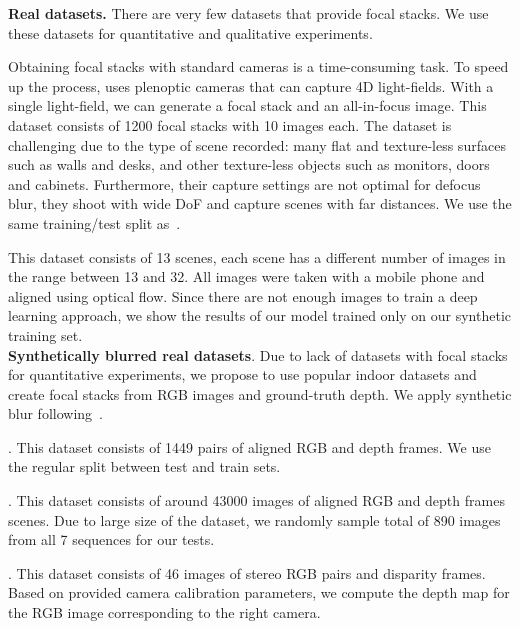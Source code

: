 \documentclass[10pt,twocolumn,letterpaper]{article}
\begin{document}
\noindent\textbf{Real datasets.} There are very few datasets that provide focal stacks. We use these datasets for quantitative and qualitative experiments.

 Obtaining focal stacks with standard cameras is a time-consuming task. To speed up the process, \cite{Hazirbas18} uses plenoptic cameras that can capture 4D light-fields. With a single light-field, we can generate a focal stack and an all-in-focus image. 
This dataset consists of 1200 focal stacks with 10 images each. 
The dataset is challenging due to the type of scene recorded: many flat and texture-less surfaces such as walls and desks, and other texture-less objects such as monitors, doors and cabinets. Furthermore, their capture settings are not optimal for defocus blur, they shoot with wide DoF and capture scenes with far distances.
We use the same training/test split as~\cite{Hazirbas18}. 

 This dataset consists of 13 scenes, each scene has a different number of images in the range between 13 and 32. All images were taken with a mobile phone and aligned using optical flow.
Since there are not enough images to train a deep learning approach, we show the results of our model trained only on our synthetic training set.\\


\vspace{-0.5cm}
\noindent\textbf{Synthetically blurred real datasets}. Due to lack of datasets with focal stacks for quantitative experiments, we propose to use popular indoor datasets and create focal stacks from RGB images and ground-truth depth. We apply synthetic blur following~\cite{DBLP:conf/cvpr/GurW19}.

. 
This dataset consists of 1449 pairs of aligned RGB and depth frames. We use the regular split between test and train sets.

. This dataset consists of around 43000 images of aligned RGB and depth frames scenes. Due to large size of the dataset, we randomly sample total of 890 images from all 7 sequences for our tests.

. This dataset consists of 46 images of stereo RGB pairs and disparity frames. Based on provided camera calibration parameters, we compute the depth map for the RGB image corresponding to the right camera. 
\end{document}
